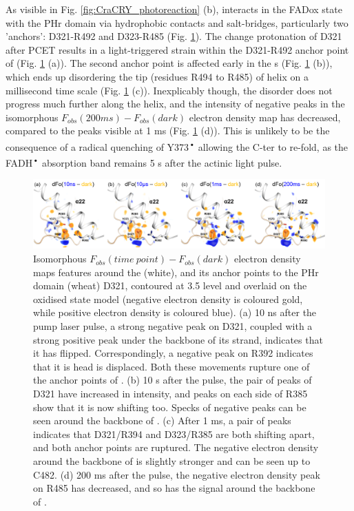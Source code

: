 As visible in Fig. \ref{fig:CraCRY_photoreaction} (b),  interacts in the FADox state with the PHr domain via hydrophobic contacts and salt-bridges, particularly two 'anchors': D321-R492 and D323-R485 (Fig. \ref{fig:CraCRY_Cter}). The change protonation of D321 after PCET results in a light-triggered strain within the D321-R492 anchor point of  (Fig. \ref{fig:CraCRY_Cter} (a)). The second anchor point is affected early in the \textmu s (Fig. \ref{fig:CraCRY_Cter} (b)), which ends up disordering the tip (residues R494 to R485) of helix  on a millisecond time scale (Fig. \ref{fig:CraCRY_Cter} (c)). Inexplicably though, the disorder does not progress much further along the helix, and the intensity of negative peaks in the isomorphous \(F_{obs}(200 ms) - F_{obs}(dark)\) electron density map has decreased, compared to the peaks visible at 1 ms (Fig. \ref{fig:CraCRY_Cter} (d)). This is unlikely to be the consequence of a radical quenching of Y373\textsuperscript{•} allowing the C-ter to re-fold, as the FADH\textsuperscript{•} absorption band remains 5 s after the actinic light pulse. 
\begin{figure}[H]
  \centering
  \includegraphics[width=\textwidth]{images/cracry/CraCRY_C-ter.pdf}
  \hfill
  \caption{Isomorphous \(F_{obs}(time\ point) - F_{obs}(dark)\) electron density maps features around the  (white), and its anchor points to the PHr domain (wheat) D321, contoured at 3.5 \textsigma level and overlaid on the oxidised state model (negative electron density is coloured gold, while positive electron density is coloured blue). (a) 10 ns after the pump laser pulse, a strong negative peak on D321, coupled with a strong positive peak under the backbone of its strand, indicates that it has flipped. Correspondingly, a negative peak on R392 indicates that it is head is displaced. Both these movements rupture one of the anchor points of . (b) 10 \textmu s after the pulse, the pair of peaks of D321 have increased in intensity, and peaks on each side of R385 show that it is now shifting too. Specks of negative peaks can be seen around the backbone of . (c) After 1 ms, a pair of peaks indicates that D321/R394 and D323/R385 are both shifting apart, and both anchor points are ruptured. The negative electron density around the backbone of  is slightly stronger and can be seen up to C482. (d) 200 ms after the pulse, the negative electron density peak on R485 has decreased, and so has the signal around the backbone of .}\label{fig:CraCRY_Cter}
\end{figure}
